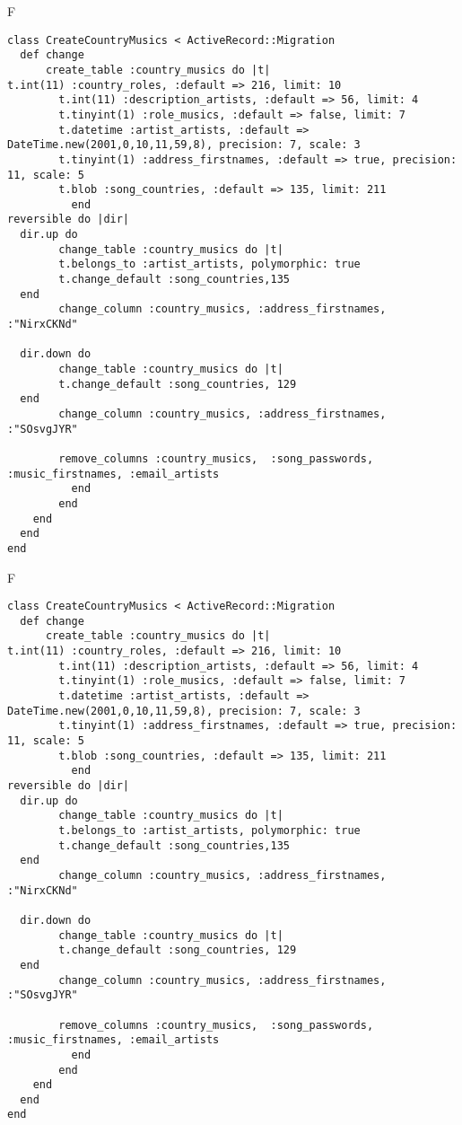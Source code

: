 F
\begin{verbatim}
class CreateCountryMusics < ActiveRecord::Migration
  def change
	  create_table :country_musics do |t|
t.int(11) :country_roles, :default => 216, limit: 10
		t.int(11) :description_artists, :default => 56, limit: 4
		t.tinyint(1) :role_musics, :default => false, limit: 7
		t.datetime :artist_artists, :default => DateTime.new(2001,0,10,11,59,8), precision: 7, scale: 3
		t.tinyint(1) :address_firstnames, :default => true, precision: 11, scale: 5
		t.blob :song_countries, :default => 135, limit: 211
		  end
reversible do |dir|
  dir.up do
		change_table :country_musics do |t|
		t.belongs_to :artist_artists, polymorphic: true
 		t.change_default :song_countries,135
  end
 		change_column :country_musics, :address_firstnames, :"NirxCKNd"
   
  dir.down do
		change_table :country_musics do |t|
		t.change_default :song_countries, 129
  end
 		change_column :country_musics, :address_firstnames, :"SOsvgJYR"
   
		remove_columns :country_musics,  :song_passwords, :music_firstnames, :email_artists 
	      end
	    end
    end 
  end
end

\end{verbatim}

F
\begin{verbatim}
class CreateCountryMusics < ActiveRecord::Migration
  def change
	  create_table :country_musics do |t|
t.int(11) :country_roles, :default => 216, limit: 10
		t.int(11) :description_artists, :default => 56, limit: 4
		t.tinyint(1) :role_musics, :default => false, limit: 7
		t.datetime :artist_artists, :default => DateTime.new(2001,0,10,11,59,8), precision: 7, scale: 3
		t.tinyint(1) :address_firstnames, :default => true, precision: 11, scale: 5
		t.blob :song_countries, :default => 135, limit: 211
		  end
reversible do |dir|
  dir.up do
		change_table :country_musics do |t|
		t.belongs_to :artist_artists, polymorphic: true
 		t.change_default :song_countries,135
  end
 		change_column :country_musics, :address_firstnames, :"NirxCKNd"
   
  dir.down do
		change_table :country_musics do |t|
		t.change_default :song_countries, 129
  end
 		change_column :country_musics, :address_firstnames, :"SOsvgJYR"
   
		remove_columns :country_musics,  :song_passwords, :music_firstnames, :email_artists 
	      end
	    end
    end 
  end
end

\end{verbatim}

